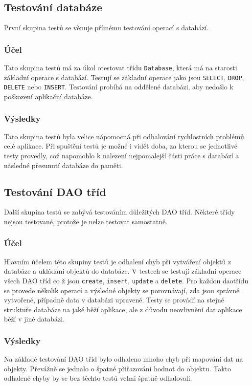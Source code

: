 \documentclass[thesis=B,czech]{resources/FITthesis}[2012/06/26]
\begin{document}
		\subsection{Testování databáze}
První skupina testů se věnuje přímému testování operací s databází. 
			\subsubsection*{Účel}
Tato skupina testů má za úkol otestovat třídu \texttt{Database}, která má na starosti základní operace s databází. Testují se základní operace jako jsou \texttt{SELECT}, \texttt{DROP}, \texttt{DELETE} nebo \texttt{INSERT}. Testování probíhá na oddělené databázi, aby nedošlo k poškození aplikační databáze. 			

			\subsubsection*{Výsledky}
Tato skupina testů byla velice nápomocná při odhalování rychlostních problémů celé aplikace. Při spuštění testů je možné i vidět doba, za kterou se jednotlivé testy provedly, což napomohlo k nalezení nejpomalejší části práce s databází a následné přesunutí databáze do paměti.

		\subsection{Testování DAO tříd}
Další skupina testů se zabývá testováním důležitých DAO tříd. Některé třídy nejsou testované, protože je nelze testovat samostatně.
			\subsubsection*{Účel}
Hlavním účelem této skupiny testů je odhalení chyb při vytváření objektů z databáze a ukládání objektů do databáze. V testech se testují základní operace všech DAO tříd co ž jsou \texttt{create}, \texttt{insert}, \texttt{update} a \texttt{delete}. Pro každou daotřídu se provede několik operací a výsledné objekty se porovnávají, zda jsou správně vytvořené, případně data v databázi upravené. Testy se provádí na stejné struktuře databáze na jaké běží aplikace, ale z důvodu neovlivnění dat aplikace běží v jiné databázi.
			
			\subsubsection*{Výsledky}
Na základě testování DAO tříd bylo odhaleno mnoho chyb při mapování dat na objekty. Převážně se jednalo o špatné přiřazování hodnot do objektu. Takto odhalené chyby by se bez těchto testů velmi špatně odhalovali.			
\end{document}
